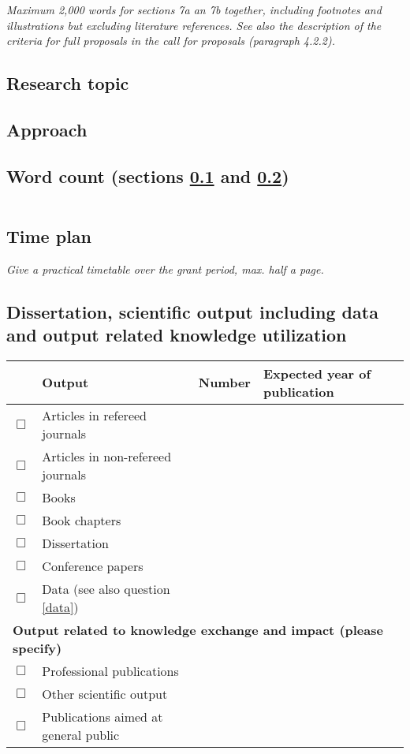\noindent{}

\textit{Maximum 2,000 words for sections 7a an 7b together, including footnotes and illustrations but excluding literature references. See also the description of the criteria for full proposals in the call for proposals (paragraph 4.2.2).}

\subsection{Research topic}\label{restop}

\subsection{Approach}\label{appl}

\subsection{Word count (sections \ref{restop} and \ref{appl})}

\begin{tabular}{|c|c|c|c|}
\hline
&&& \\
\hline
\end{tabular}

\subsection{Time plan}
\textit{Give a practical timetable over the grant period, max. half a page.}

\subsection{Dissertation, scientific output including data and output related knowledge utilization}

\begin{tabular}{|c|p{5cm}|c|l|}
\hline
	& Output & Number & Expected year of publication \\
\hline
	$\Box$ & Articles in refereed journals && \\
\hline
	$\Box$ & Articles in non-refereed journals && \\
\hline
	$\Box$ & Books && \\
\hline
	$\Box$ & Book chapters && \\
\hline
	$\Box$ & Dissertation && \\
\hline
	$\Box$ & Conference papers && \\
\hline
	$\Box$ & Data (see also question \ref{data}) && \\
\hline
	\multicolumn{4}{|l|}{\textbf{Output related to knowledge exchange and impact (please specify)}} \\
\hline
	$\Box$ & Professional publications && \\
\hline
	$\Box$ & Other scientific output && \\
\hline
	$\Box$ & Publications aimed at general public && \\
\hline
\end{tabular}

